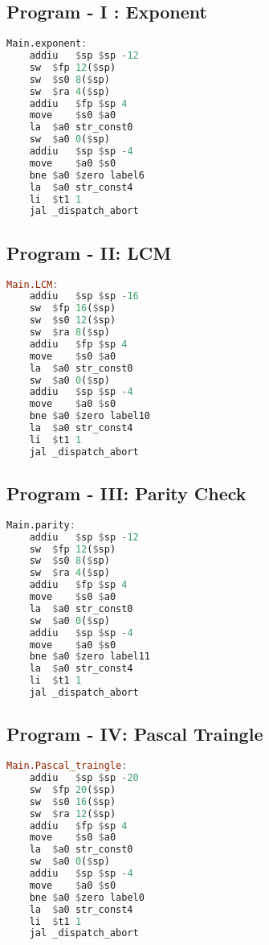 \documentclass[english,a4paper,12pt]{article}
\begin{document}
 \subsection*{\textbf{Program - I }: Exponent}
 
\begin{lstlisting}[language=Haskell,caption=\textit{exponent.s}]
Main.exponent:
	addiu	$sp $sp -12
	sw	$fp 12($sp)
	sw	$s0 8($sp)
	sw	$ra 4($sp)
	addiu	$fp $sp 4
	move	$s0 $a0
	la	$a0 str_const0
	sw	$a0 0($sp)
	addiu	$sp $sp -4
	move	$a0 $s0
	bne	$a0 $zero label6
	la	$a0 str_const4
	li	$t1 1
	jal	_dispatch_abort
\end{lstlisting}
\newpage

 \subsection*{\textbf{Program - II}: LCM}
 
\begin{lstlisting}[language=Haskell,caption=\textit{LCM.s}]
Main.LCM:
	addiu	$sp $sp -16
	sw	$fp 16($sp)
	sw	$s0 12($sp)
	sw	$ra 8($sp)
	addiu	$fp $sp 4
	move	$s0 $a0
	la	$a0 str_const0
	sw	$a0 0($sp)
	addiu	$sp $sp -4
	move	$a0 $s0
	bne	$a0 $zero label10
	la	$a0 str_const4
	li	$t1 1
	jal	_dispatch_abort
\end{lstlisting}

\vspace{10mm}
 \subsection*{\textbf{Program - III}: Parity Check}
 
\begin{lstlisting}[language=Haskell,caption=\textit{parity.s}]
Main.parity:
	addiu	$sp $sp -12
	sw	$fp 12($sp)
	sw	$s0 8($sp)
	sw	$ra 4($sp)
	addiu	$fp $sp 4
	move	$s0 $a0
	la	$a0 str_const0
	sw	$a0 0($sp)
	addiu	$sp $sp -4
	move	$a0 $s0
	bne	$a0 $zero label11
	la	$a0 str_const4
	li	$t1 1
	jal	_dispatch_abort
\end{lstlisting}
\newpage

 \subsection*{\textbf{Program - IV}: Pascal Traingle}
\begin{lstlisting}[language=Haskell,caption=\textit{Pascal\_triangle.s}]
Main.Pascal_traingle:
	addiu	$sp $sp -20
	sw	$fp 20($sp)
	sw	$s0 16($sp)
	sw	$ra 12($sp)
	addiu	$fp $sp 4
	move	$s0 $a0
	la	$a0 str_const0
	sw	$a0 0($sp)
	addiu	$sp $sp -4
	move	$a0 $s0
	bne	$a0 $zero label0
	la	$a0 str_const4
	li	$t1 1
	jal	_dispatch_abort
\end{lstlisting}
\end{document}
